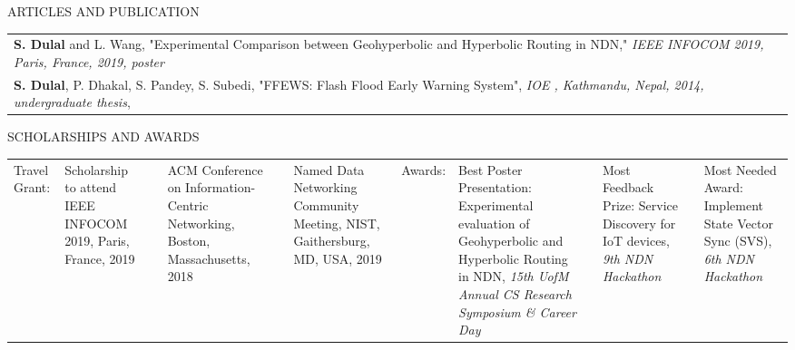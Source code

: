 \documentclass{resume} %
\begin{document}
    

\begin{rSection}{ARTICLES AND PUBLICATION}
\vspace{-0.2cm}
    \noindent
        \begin{tabular}{ p{16.5cm} p{.3cm}}
        \textbf{S. Dulal} and L. Wang, "Experimental Comparison between Geohyperbolic and Hyperbolic Routing in NDN," \textit{IEEE INFOCOM 2019, Paris, France, 2019, poster} \\
        \textbf{S. Dulal}, P. Dhakal, S. Pandey, S. Subedi, "FFEWS: Flash Flood Early Warning System", \textit{IOE , Kathmandu, Nepal, 2014, undergraduate thesis}, \\
        \end{tabular}
\end{rSection}
\vspace{-0.2cm}
\begin{rSection}{SCHOLARSHIPS AND AWARDS}
\vspace{-0.2cm}
\begin{multicols}{1}
    \noindent
    \begin{tabular}{p{2.4cm} p{14.3cm}}
    Travel Grant: & Scholarship to attend IEEE INFOCOM 2019, Paris, France, 2019 & & 
    ACM Conference on Information-Centric Networking, Boston, Massachusetts, 2018 & & Named Data Networking Community Meeting, NIST, Gaithersburg, MD, USA, 2019
    \vspace{0.1cm}
    & Awards: & Best Poster Presentation: Experimental evaluation of Geohyperbolic and Hyperbolic Routing in NDN, \textit{15th UofM Annual CS Research Symposium \& Career Day} & & Most Feedback Prize: Service Discovery for IoT devices, \textit{9th NDN Hackathon} & & Most Needed Award: Implement State Vector Sync (SVS), \textit{6th NDN Hackathon}
    
    \end{tabular}
    \end{multicols}
\end{rSection}
\end{document}
